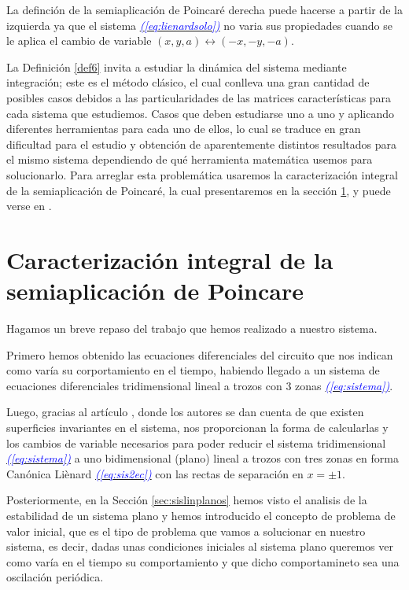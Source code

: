 \documentclass[12pt,a4paper]{report} %
\newcommand{\eref}[1]{\hyperref[#1]{\textcolor{blue}{\textit{(\ref*{#1})}}}}
\begin{document}
	La definción de la semiaplicación de Poincaré derecha puede hacerse a partir de la izquierda ya que el sistema \eref{eq:lienardsolo} no varia sus propiedades cuando se le aplica el cambio de variable $(x,y,a)\longleftrightarrow(-x,-y,-a)$.
	
	
	\vspace{0.5cm} La Definición \ref{def6} invita a estudiar la dinámica del sistema mediante integración; este es el método clásico, el cual conlleva una gran cantidad de posibles casos debidos a las particularidades de las matrices características para cada sistema que estudiemos. Casos que deben estudiarse uno a uno y aplicando diferentes herramientas para cada uno de ellos, lo cual se traduce en gran dificultad para el estudio y obtención de aparentemente distintos resultados para el mismo sistema dependiendo de qué herramienta matemática usemos para solucionarlo. Para arreglar esta problemática usaremos la caracterización integral de la semiaplicación de Poincaré, la cual presentaremos en la sección \ref{sec41}, y puede verse en \cite{caracterizacion}.
	\newpage
	
	
	
	\section{Caracterización integral de la semiaplicación de Poincare}
	\label{sec41}
	
	 Hagamos un breve repaso del trabajo que hemos realizado a nuestro sistema.
	

	 \noindent Primero hemos obtenido las ecuaciones diferenciales del circuito que nos indican como varía su corportamiento en el tiempo, habiendo llegado a un sistema de ecuaciones diferenciales tridimensional lineal a trozos con 3 zonas \eref{eq:sistema}. 
	
	\vspace{0.5cm}\noindent Luego, gracias al artículo \cite{ponce}, donde los autores se dan cuenta de que existen superficies invariantes en el sistema, nos proporcionan la forma de calcularlas y los cambios de variable necesarios para poder reducir el sistema tridimensional \eref{eq:sistema} a uno bidimensional (plano) lineal a trozos con tres zonas en forma Canónica Liènard \eref{eq:sis2ec} con las rectas de separación en $x=\pm1$. 
	
	\vspace{0.5cm}\noindent Posteriormente, en la Sección \ref{sec:sislinplanos} hemos visto el analisis de la estabilidad de un sistema plano y hemos introducido el concepto de problema de valor inicial, que es el tipo de problema que vamos a solucionar en nuestro sistema, es decir, dadas unas condiciones iniciales al sistema plano queremos ver como varía en el tiempo su comportamiento y que dicho comportamineto sea una oscilación periódica. 
	
\end{document}
